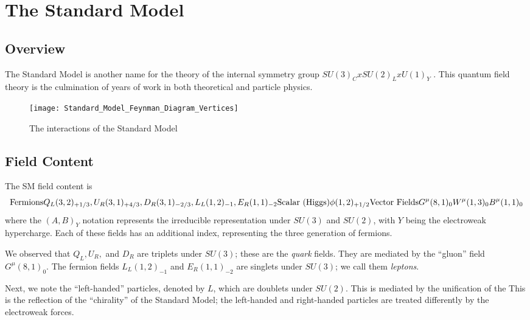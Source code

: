 \section{The Standard Model}

\subsection{Overview}

The Standard Model is another name for the theory of the internal symmetry group $SU(3)_C x SU(2)_L x U(1)_Y$ .
This quantum field theory is the culmination of years of work in both theoretical and particle physics.  

\begin{figure}
\caption{The interactions of the Standard Model}
\texttt{[image: Standard\_Model\_Feynman\_Diagram\_Vertices]}
\end{figure}

\subsection{Field Content}

The SM field content is
\begin{equation}
\text{Fermions} Q_L(3,2)_{+1/3}, \xspace  U_R(3,1)_{+4/3},\xspace  D_R(3,1)_{-2/3} ,\xspace  L_L(1,2)_{-1} ,\xspace  E_R(1,1)_{-2}\\
\text{Scalar (Higgs)} \xspace \phi(1,2)_{+1/2} \\
\text{Vector Fields} \xspace G^\mu(8,1)_0 \xspace W^\mu(1,3)_0  \xspace B^\mu(1,1)_0
\end{equation}
where the $(A, B)_Y$ notation represents the irreducible representation under $SU(3)$ and $SU(2)$, with $Y$ being the electroweak hypercharge.
Each of these fields has an additional index, representing the three generation of fermions.

We observed that $Q_L, U_R,$ and $D_R$ are triplets under $SU(3)$; these are the \textit{quark} fields.
They are mediated by the ``gluon'' field $G^\mu(8,1)_0$.
The fermion fields $L_L(1,2)_{-1}$ and $  E_R(1,1)_{-2} $ are singlets under $SU(3)$; we call them \textit{leptons}.

Next, we note the ``left-handed'' particles, denoted by $L$, which are doublets under $SU(2)$.
This is mediated by the unification of the
This is the reflection of the ``chirality'' of the Standard Model; the left-handed and right-handed particles are treated differently by the electroweak forces.


